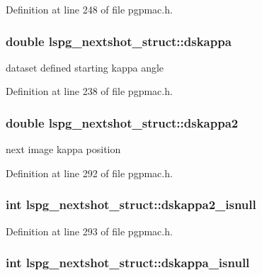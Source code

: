 Definition at line 248 of file pgpmac.\-h.

\hypertarget{structlspg__nextshot__struct_a59355281e8eb935cd7bfac597fdc5289}{
\subsubsection[{dskappa}]{\setlength{\rightskip}{0pt plus 5cm}double lspg\-\_\-nextshot\-\_\-struct\-::dskappa}}\label{structlspg__nextshot__struct_a59355281e8eb935cd7bfac597fdc5289}


dataset defined starting kappa angle 



Definition at line 238 of file pgpmac.\-h.

\hypertarget{structlspg__nextshot__struct_a8571a0b95fb6ea6356fd7204b9c9e371}{
\subsubsection[{dskappa2}]{\setlength{\rightskip}{0pt plus 5cm}double lspg\-\_\-nextshot\-\_\-struct\-::dskappa2}}\label{structlspg__nextshot__struct_a8571a0b95fb6ea6356fd7204b9c9e371}


next image kappa position 



Definition at line 292 of file pgpmac.\-h.

\hypertarget{structlspg__nextshot__struct_a9a7e47372f4f6e0e48a0cb3c78fa8437}{
\subsubsection[{dskappa2\-\_\-isnull}]{\setlength{\rightskip}{0pt plus 5cm}int lspg\-\_\-nextshot\-\_\-struct\-::dskappa2\-\_\-isnull}}\label{structlspg__nextshot__struct_a9a7e47372f4f6e0e48a0cb3c78fa8437}


Definition at line 293 of file pgpmac.\-h.

\hypertarget{structlspg__nextshot__struct_a1686a72509cc1c3383ee95a790ddff14}{
\subsubsection[{dskappa\-\_\-isnull}]{\setlength{\rightskip}{0pt plus 5cm}int lspg\-\_\-nextshot\-\_\-struct\-::dskappa\-\_\-isnull}}\label{structlspg__nextshot__struct_a1686a72509cc1c3383ee95a790ddff14}


